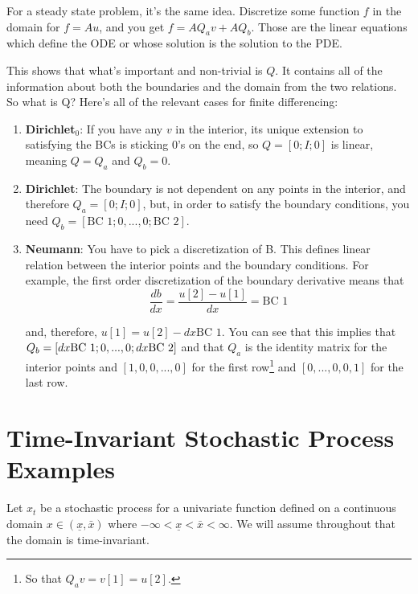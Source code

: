\documentclass[11pt]{article}
\begin{document}
\begin{itemize}
For a steady state problem, it's the same idea. Discretize some function $f$ in the domain for $f = Au$, and you get $f = AQ_av + AQ_b$. Those are the linear equations which define the ODE or whose solution is the solution to the PDE.

This shows that what's important and non-trivial is $Q$. It contains all of the information about both the boundaries and the domain from the two relations. So what is Q? Here's all of the relevant cases for finite differencing:
\begin{enumerate}
	\item \textbf{Dirichlet$_0$}: If you have any $v$ in the interior, its unique extension to satisfying the BCs is sticking $0$'s on the end, so $Q = [0;I;0]$ is linear, meaning $Q = Q_a$ and $Q_b=0$.
	
	\item \textbf{Dirichlet}: The boundary is not dependent on any points in the interior, and therefore $Q_a = [0;I;0]$, but, in order to satisfy the boundary conditions, you need $ Q_b=[\text{BC 1};0,...,0;\text{BC 2}]$.
	
	\item \textbf{Neumann}: You have to pick a discretization of B. 
	This defines linear relation between the interior points and the boundary conditions. For example, the first order discretization of the boundary derivative means that 
	\begin{equation}
	\frac{db}{dx} = \frac{u[2] - u[1]}{dx} = \text{BC 1}
	\end{equation}
	
	and, therefore, $u[1] = u[2] - dx\text{BC 1}$. You can see that this implies that $Q_b = [dx\text{BC 1};0,...,\\0;dx \text{BC 2}]$ and that $Q_a$ is the identity matrix for the interior points and $[1,0, 0,...,0]$ for the first row\footnote{So that $Q_a v = v[1] = u[2]$.} and $[0,...,0,0,1]$ for the last row.%
	

\end{enumerate}
\end{itemize}

\section{Time-Invariant Stochastic Process Examples}
Let $x_t$ be a stochastic process for a univariate function defined on a continuous domain $x \in (\underline{x}, \bar{x})$ where $-\infty < \underline{x} < \bar{x} < \infty$.  We will assume throughout that the domain is time-invariant.
\end{document}

